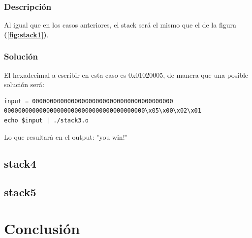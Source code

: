 \documentclass[a4paper,10pt]{article}
\begin{document}
\subsubsection{Descripción}
Al igual que en los casos anteriores, el stack será el mismo que el de la figura \textbf{(\ref{fig:stack1})}.
\subsubsection{Solución}

El hexadecimal a escribir en esta caso es 0x01020005, de manera que una posible solución será:

\begin{lstlisting}
input = 0000000000000000000000000000000000000000
0000000000000000000000000000000000000000\x05\x00\x02\x01
echo $input | ./stack3.o
\end{lstlisting}

\bigskip

Lo que resultará en el output: "you win!"

\subsection{stack4}
\lstset{ language = C, numbers=left, tabsize=4, breaklines=true, frame=single }


\subsection{stack5}

\lstset{ language = C, numbers=left, tabsize=4, breaklines=true, frame=single }


\lstset{ language = C, numbers=left, tabsize=4, breaklines=true, frame=single }


\lstset{ language = C, numbers=left, tabsize=4, breaklines=true, frame=single }


\lstset{ language = C, numbers=left, tabsize=4, breaklines=true, frame=single }


\section{Conclusión}
\end{document}
